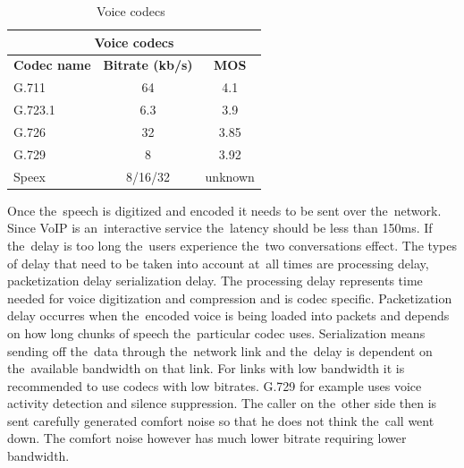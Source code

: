 \begin{table}
\begin{center}
\begin{tabular}{|l|c|c|}
	\hline
	\multicolumn{3}{|c|}{\textbf{Voice codecs}}	\\
	\hline
		\textbf{Codec name} & \textbf{Bitrate (kb/s)} & \textbf{MOS} \\
	\hline
	G.711	& 64 & 4.1 \\
	\hline
	G.723.1 & 6.3 & 3.9 \\
	\hline
	G.726 & 32 & 3.85 \\ 
	\hline
	G.729 & 8  & 3.92 \\ 
	\hline
	Speex	& 8/16/32 & unknown \\
	\hline	
\end{tabular}
\end{center}
\label{tab:voipCodecs}
\caption{Voice codecs~\cite{voipPaper}}
\end{table}

Once the~speech is digitized and encoded it needs to be sent over the~network. Since VoIP is an~interactive service the~latency should be less than 150ms. If the~delay is too long the~users experience the~two conversations effect. The types of delay that need to be taken into account at~all times are processing delay, packetization delay serialization delay. The processing delay represents time needed for voice digitization and compression and is codec specific. Packetization delay occurres when the~encoded voice is being loaded into packets and depends on how long chunks of speech the~particular codec uses. Serialization means sending off the~data through the~network link and the~delay is dependent on the~available bandwidth on that link. For links with low bandwidth it is recommended to use codecs with low bitrates. G.729 for example uses voice activity detection and silence suppression. The caller on the~other side then is sent carefully generated comfort noise so that he does not think the~call went down. The comfort noise however has much lower bitrate requiring lower bandwidth.

